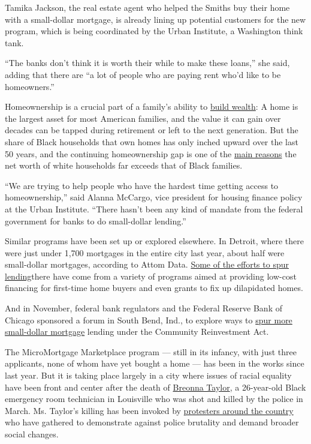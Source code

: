 Tamika Jackson, the real estate agent who helped the Smiths buy their
home with a small-dollar mortgage, is already lining up potential
customers for the new program, which is being coordinated by the Urban
Institute, a Washington think tank.

``The banks don't think it is worth their while to make these loans,''
she said, adding that there are ``a lot of people who are paying rent
who'd like to be homeowners.''

Homeownership is a crucial part of a family's ability to
\href{https://www.nytimes.com/2020/06/09/your-money/race-income-equality.html}{build
wealth}: A home is the largest asset for most American families, and the
value it can gain over decades can be tapped during retirement or left
to the next generation. But the share of Black households that own homes
has only inched upward over the last 50 years, and the continuing
homeownership gap is one of the
\href{https://www.brookings.edu/blog/up-front/2020/02/27/examining-the-black-white-wealth-gap/}{main
reasons} the net worth of white households far exceeds that of Black
families.

``We are trying to help people who have the hardest time getting access
to homeownership,'' said Alanna McCargo, vice president for housing
finance policy at the Urban Institute. ``There hasn't been any kind of
mandate from the federal government for banks to do small-dollar
lending.''

Similar programs have been set up or explored elsewhere. In Detroit,
where there were just under 1,700 mortgages in the entire city last
year, about half were small-dollar mortgages, according to Attom Data.
\href{https://www.nytimes.com/2017/11/04/business/detroit-housing.html}{Some
of the efforts to spur lending}there have come from a variety of
programs aimed at providing low-cost financing for first-time home
buyers and even grants to fix up dilapidated homes.

And in November, federal bank regulators and the Federal Reserve Bank of
Chicago sponsored a forum in South Bend, Ind., to explore ways to
\href{https://www.occ.gov/news-events/events/files/event-cra-small-dollar-mortgage-strategies-11192019.html}{spur
more small-dollar mortgage} lending under the Community Reinvestment
Act.

The MicroMortgage Marketplace program --- still in its infancy, with
just three applicants, none of whom have yet bought a home --- has been
in the works since last year. But it is taking place largely in a city
where issues of racial equality have been front and center after the
death of
\href{https://www.nytimes.com/article/breonna-taylor-police.html}{Breonna
Taylor}, a 26-year-old Black emergency room technician in Louisville who
was shot and killed by the police in March. Ms. Taylor's killing has
been invoked by
\href{https://www.nytimes.com/news-event/george-floyd-protests-minneapolis-new-york-los-angeles}{protesters
around the country} who have gathered to demonstrate against police
brutality and demand broader social changes.

